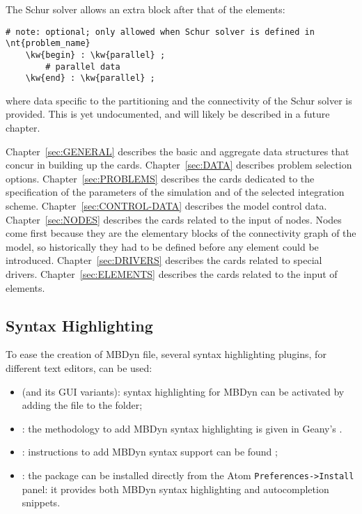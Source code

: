 The Schur solver allows an extra block after that of the elements:
\begin{Verbatim}[commandchars=\\\{\}]
    # note: optional; only allowed when Schur solver is defined in \nt{problem_name}
    \kw{begin} : \kw{parallel} ;
        # parallel data
    \kw{end} : \kw{parallel} ;
\end{Verbatim}
where data specific to the partitioning and the connectivity
of the Schur solver is provided.
This is yet undocumented, and will likely be described
in a future chapter.

Chapter~\ref{sec:GENERAL} describes the basic and aggregate
data structures that concur in building up the cards.
Chapter~\ref{sec:DATA} describes problem selection options.
Chapter~\ref{sec:PROBLEMS} describes the cards dedicated
to the specification of the parameters of the simulation
and of the selected integration scheme.
Chapter~\ref{sec:CONTROL-DATA} describes the model control data.
Chapter~\ref{sec:NODES} describes the cards related to the input
of nodes.
Nodes come first because they are the elementary blocks
of the connectivity graph of the model, so historically
they had to be defined before any element could be introduced.
Chapter~\ref{sec:DRIVERS} describes the cards related
to special drivers.
Chapter~\ref{sec:ELEMENTS} describes the cards related to the input
of elements.

\subsection{Syntax Highlighting}
To ease the creation of MBDyn file, several syntax highlighting plugins, for
different text editors, can be used:

\begin{itemize}
  \item {}
  (and its GUI variants): syntax highlighting for MBDyn can be activated by
  adding the  file to the
   folder;
  \item {}: the
  methodology to add MBDyn syntax highlighting is given in Geany's
  .
  \item {}:
  instructions to add MBDyn syntax support can be found
  ;
  \item {}: the
  package can be installed directly from the Atom \texttt{Preferences->Install}
  panel: it provides both MBDyn syntax highlighting and autocompletion snippets.
\end{itemize}

